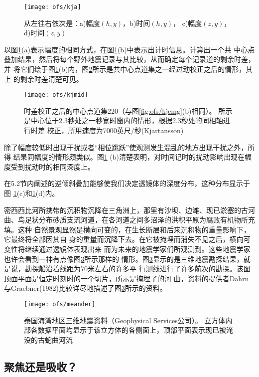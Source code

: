 \begin{figure}[H]
\centering
\texttt{[image: ofs/kja]}
\caption[kja]{从左往右依次是：a)幅度$(h,y)$，b)时间$(h,y)$，
c)幅度$(z,y)$，d)时间$(z,y)$}
\label{fig:ofs/kja}
\end{figure}

以图\ref{fig:ofs/kja}(a)表示幅度的相同方式，在图\ref{fig:ofs/kja}(b)中表示出计时信息。计算出一个共
中心点叠加结杲，然后将每个野外地震记录与其比较，从而确定每个记录道的剩余时差，并
将它们绘于图\ref{fig:ofs/kja}(b)内，图\ref{fig:ofs/kjmid}所示是共中心点道集之一经过动校正之后的情形，其上
的剩余时差清楚可见。

\begin{figure}[H]
\centering
\texttt{[image: ofs/kjmid]}
\caption[kjmid]{时差校正之后的中心点道集220（与图\ref{fig:ofs/kjcmg}(b)相同）。
所示是中心位于2.3秒处之一秒宽时窗内的情形，根据2.3秒处的同相轴进行时差
校正，所用速度为7000英尺/秒(Kjartansson)}
\label{fig:ofs/kjmid}
\end{figure}

除了幅度较低时出现干扰或者“相位跳跃”使观测发生混乱的地方出现干扰之外，所得
结杲同幅度的情形颇类似。图\ref{fig:ofs/kja}
(b)清楚表明，对时间记时的扰动影响出现在幅度受到扰动时的相同深度上。

在5.2节内阐述的逆倾斜叠加能够使我们决定透镜体的深度分布，这种分布显示于图
\ref{fig:ofs/kja}(c)和\ref{fig:ofs/kja}(d)内。

密西西比河所携带的沉积物沉降在三角洲上，那里有沙坝、边滩、现已淤塞的古河
曲、鸟足状分布砂质支流河道，在各河道之间多沼泽的洪积平原为腐败有机物所充填。这种
自然景观显然是横向可变的，在生长断层和后来沉积物的重量影响下，它最终将全部因其自
身的重量而沉降下去。在它被掩埋而消失不见之后，横向可变性将继续通过透镜体表现出来
而为未来的地震学家们所观测到。这些地震学家也许会看到一神有点像图\ref{fig:ofs/meander}所示那样的
情形。图\ref{fig:ofs/meander}显示的是三维地震勘探结果，就是说，勘探船沿着线距为70米左右的许多平
行测线进行了许多航次的勘探。该图顶面平面是恒定时刻时的一个切片，所示是掩埋了的河
曲，资料的提供者Dahrn与Graebner(1982)比较详尽地描述了图\ref{fig:ofs/meander}所示的资料。
\begin{figure}[H]
\centering
\texttt{[image: ofs/meander]}
\caption[meander]{泰国海湾地区三维地震资料（Geophysical Services公司）。
立方体内部各数据平面均显示于该立方体的各侧面上，顶部平面表示现已被淹没的古蛇曲河流}
\label{fig:ofs/meander}
\end{figure}

\subsection{聚焦还是吸收？}
\label{sec:3.1.3}

